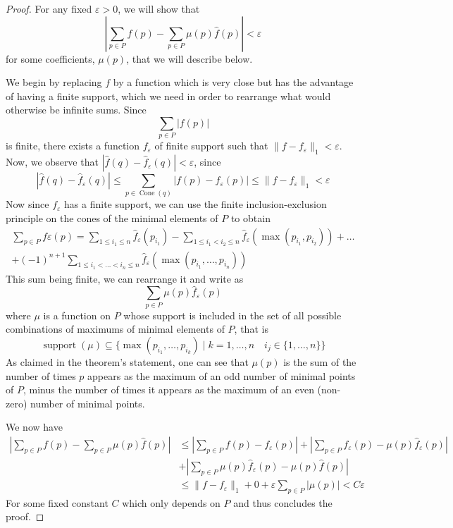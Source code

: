 \documentclass{memo-l}
\theoremstyle{plain}
\theoremstyle{definition}
\numberwithin{section}{chapter}
\numberwithin{equation}{chapter}
\DeclareMathOperator{\Cone}{Cone}
\DeclareMathOperator{\support}{support}
\theoremstyle{plain}
\theoremstyle{definition}
\begin{document}
\begin{proof} For any fixed \(
\varepsilon > 0 \), we will show that \[ \left| \sum_{p \in P} f(p) -
\sum_{p \in P} \mu(p) \widehat f(p) \right| < \varepsilon \] for some
coefficients, \( \mu(p) \), that we will describe below.

We begin by replacing \( f \) by a function which is very close but has the
advantage of having a finite support, which we need in order to rearrange
what would otherwise be infinite sums. Since \[ \sum_{p \in P} |f(p)| \] is
finite, there exists a function \( f_\varepsilon \) of finite support such
that \( \| f - f_\varepsilon \|_1 < \varepsilon \). Now, we observe that \(
| \widehat f(q) - \widehat f_\varepsilon(q) | < \varepsilon \), since \[ |
\widehat f(q) - \widehat f_\varepsilon(q) | \leq \sum_{p \in \Cone(q)}
\!\!\!\!\! |f(p) - f_\varepsilon(p) | \leq \| f - f_\varepsilon \|_1 <
\varepsilon \] Now since \( f_\varepsilon \) has a finite support, we can
use the finite inclusion-exclusion principle on the cones of the minimal
elements of \( P \) to obtain \begin{multline*} \sum_{p \in P}
f\varepsilon(p) = \sum_{1 \leq i_1 \leq n} \widehat f_\varepsilon(p_{i_1})
- \!\!\!\!\! \sum_{1 \leq i_1<i_2 \leq n} \!\!\!\!\! \widehat
f_\varepsilon(\max(p_{i_1},p_{i_2})) + \ldots \\ + (-1)^{n+1} \!\!\!\!\!
\sum_{1 \leq i_1< \ldots <i_n \leq n} \!\!\!\!\! \widehat
f_\varepsilon(\max(p_{i_1}, \ldots, p_{i_n})) \end{multline*} This sum
being finite, we can rearrange it and write as \[ \sum_{p \in P} \mu(p)
\widehat f_\varepsilon(p) \] where \( \mu \) is a function on \(P\) whose
support is included in the set of all possible combinations of maximums of
minimal elements of \( P \), that is \[ \support(\mu) \subseteq \{
\max(p_{i_1}, \ldots, p_{i_k}) \mid k=1,\ldots,n \quad i_j \in \{ 1,
\ldots, n\} \} \] As claimed in the theorem's statement, one can see that
\( \mu(p) \) is the sum of the number of times \(p\) appears as the maximum
of an odd number of minimal points of \(P\), minus the number of times it
appears as the maximum of an even (non-zero) number of minimal points.

We now have \begin{align*} \left| \sum_{p \in P} f(p) - \sum_{p \in P}
\mu(p) \widehat f(p) \right| &\leq \left| \sum_{p \in P} f(p) -
f_\varepsilon(p) \right| + \left|\sum_{p \in P}
f_\varepsilon(p)-\mu(p)\widehat f_\varepsilon(p) \right| \\ &+
\left|\sum_{p \in P} \mu(p)\widehat f_\varepsilon(p) - \mu(p) \widehat f(p)
\right| \\ &\leq \| f-f_\varepsilon \|_1 + 0 + \varepsilon \sum_{p \in P}
|\mu(p)| < C \varepsilon \end{align*} For some fixed constant \( C \) which
only depends on \( P \) and thus concludes the proof.  \end{proof}
\end{document}
